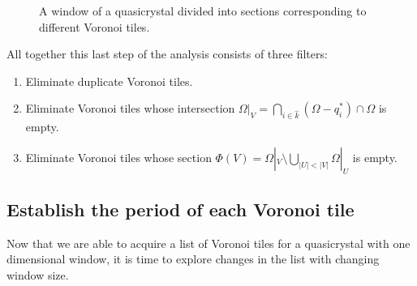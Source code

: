 \documentclass[text.tex]{subfiles}
\begin{document}
\begin{figure}[h!]


\caption{A window of a quasicrystal divided into sections corresponding to different Voronoi tiles. }
\label{fig_windowSectionsExampleWindowFinal}
\end{figure}

All together this last step of the analysis consists of three filters: 
\begin{enumerate}
\item Eliminate duplicate Voronoi tiles. 
\item Eliminate Voronoi tiles whose intersection $\Omega|_{V} = \bigcap\limits_{i\in\hat{k}}(\Omega-q_i^\ast)\cap\Omega$ is empty. 
\item Eliminate Voronoi tiles whose section $\Phi(V) = \Omega|_{V}\setminus\bigcup_{|U|<|V|}\Omega|_{U}$ is empty. 
\end{enumerate}

\subsection{Establish the period of each Voronoi tile}\label{sec_1DperiodOfVoronoiTile}
Now that we are able to acquire a list of Voronoi tiles for a quasicrystal with one dimensional window, it is time to explore changes in the list with changing window size. 
\end{document}
